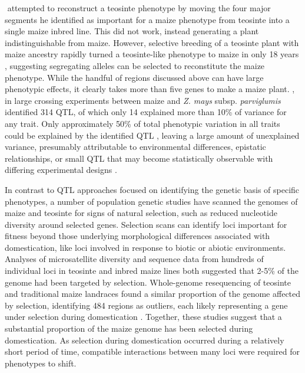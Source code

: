 \documentclass[9pt,twocolumn,twoside]{rilabRxiv}
\begin{document}
﻿\citet{mangelsdorf1974} attempted to reconstruct a teosinte phenotype by moving the four major segments he identified as important for a maize phenotype from teosinte into a single maize inbred line.
﻿This did not work, instead generating a plant indistinguishable from maize.
However, selective breeding of a teosinte plant with maize ancestry rapidly turned a teosinte-like phenotype to maize in only 18 years \citep{weatherwax1924, collins1925}, suggesting segregating alleles can be selected to reconstitute the maize phenotype.
﻿While the handful of regions discussed above can have large phenotypic effects, it clearly takes more than five genes to make a maize plant.
\citet{briggs2007}, in large crossing experiments between maize and \textit{Z. mays} subsp. \textit{parviglumis} identified 314 QTL, of which only 14 explained more than 10\% of variance for any trait.
﻿Only approximately 50\% of total phenotypic variation in all traits could be explained by the identified QTL \citep{briggs2007}, leaving a large amount of unexplained variance, presumably attributable to environmental differences, epistatic relationships, or small QTL that may become statistically observable with differing experimental designs \citep{yu2008}.

﻿In contrast to QTL approaches focused on identifying the genetic basis of specific phenotypes, a number of population genetic studies have scanned the genomes of maize and teosinte for signs of natural selection, such as reduced nucleotide diversity around selected genes.
﻿Selection scans can identify loci important for fitness beyond those underlying morphological differences associated with domestication, like loci involved in response to biotic or abiotic environments.
Analyses of microsatellite diversity \citep{vigouroux2002, vigouroux2005} and sequence data from hundreds of individual loci in teosinte and inbred maize lines \citep{wright2005} both suggested that 2-5\% of the genome had been targeted by selection.
﻿Whole-genome resequencing of teosinte and traditional maize landraces found a similar proportion of the genome affected by selection, identifying 484 regions as outliers, each likely representing a gene under selection during domestication \citep{hufford2012natgen}.
﻿Together, these studies suggest that a substantial proportion of the maize genome has been selected during domestication.
﻿As selection during domestication occurred during a relatively short period of time, compatible interactions between many loci were required for phenotypes to shift.
\end{document}
